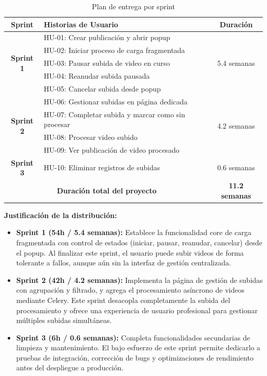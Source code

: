 \begin{table}[htbp]
\centering
\caption{Plan de entrega por sprint}
\label{tab:release_plan}
\begin{tabular}{|c|l|c|}
\hline
\textbf{Sprint} & \textbf{Historias de Usuario} & \textbf{Duración} \\
\hline
\multirow{5}{*}{\textbf{Sprint 1}} & HU-01: Crear publicación y abrir popup & \multirow{5}{*}{5.4 semanas} \\
& HU-02: Iniciar proceso de carga fragmentada & \\
& HU-03: Pausar subida de video en curso & \\
& HU-04: Reanudar subida pausada & \\
& HU-05: Cancelar subida desde popup & \\
\hline
\multirow{4}{*}{\textbf{Sprint 2}} & HU-06: Gestionar subidas en página dedicada & \multirow{4}{*}{4.2 semanas} \\
& HU-07: Completar subida y marcar como sin procesar & \\
& HU-08: Procesar video subido & \\
& HU-09: Ver publicación de video procesado & \\
\hline
\textbf{Sprint 3} & HU-10: Eliminar registros de subidas & 0.6 semanas \\
\hline
\multicolumn{2}{|c|}{\textbf{Duración total del proyecto}} & \textbf{11.2 semanas} \\
\hline
\end{tabular}
\end{table}
 
\textbf{Justificación de la distribución:}
 
\begin{itemize}
  \item \textbf{Sprint 1 (54h / 5.4 semanas):} Establece la funcionalidad core de carga fragmentada 
  con control de estados (iniciar, pausar, reanudar, cancelar) desde el popup. Al finalizar este 
  sprint, el usuario puede subir videos de forma tolerante a fallos, aunque aún sin la interfaz de 
  gestión centralizada.
 
  \item \textbf{Sprint 2 (42h / 4.2 semanas):} Implementa la página de gestión de subidas con 
  agrupación y filtrado, y agrega el procesamiento asíncrono de videos mediante Celery. Este sprint 
  desacopla completamente la subida del procesamiento y ofrece una experiencia de usuario profesional 
  para gestionar múltiples subidas simultáneas.
 
  \item \textbf{Sprint 3 (6h / 0.6 semanas):} Completa funcionalidades secundarias de limpieza y 
  mantenimiento. El bajo esfuerzo de este sprint permite dedicarlo a pruebas de integración, 
  corrección de bugs y optimizaciones de rendimiento antes del despliegue a producción.
\end{itemize}

